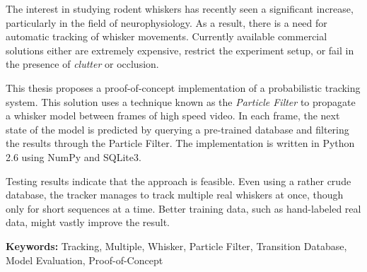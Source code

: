 The interest in studying rodent whiskers has recently seen a significant increase, 
particularly in the field of neurophysiology. As a result, there is a need for automatic 
tracking of whisker movements. Currently available commercial solutions either are 
extremely expensive, restrict the experiment setup, or fail in the presence of 
\emph{clutter} or occlusion. 

This thesis proposes a proof-of-concept implementation of a probabilistic tracking system. 
This solution uses a technique known as the \emph{Particle Filter} to propagate a whisker model between frames of high speed video. 
In each frame, the next state of the model is predicted by querying a pre-trained database and filtering the results 
through the Particle Filter. The implementation is written in Python
2.6 using NumPy and SQLite3.

Testing results indicate that the approach is feasible. Even using a
rather crude database, the tracker manages to track multiple real
whiskers at once, though only for short sequences at a time. Better
training data, such as hand-labeled real data, might vastly improve
the result.

\textbf{Keywords:} Tracking, Multiple, Whisker, Particle Filter, Transition Database, Model Evaluation, Proof-of-Concept
